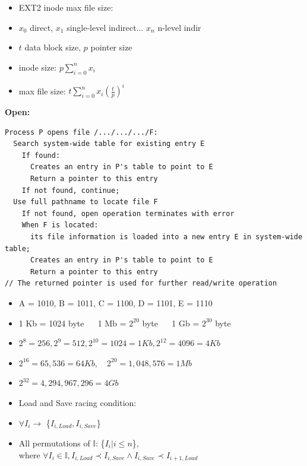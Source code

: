 \documentclass[8pt,twocolumn]{article}
\begin{document}
\begin{itemize}
  \setlength{\itemsep}{0pt} %
  \setlength{\parskip}{0pt}
  \item EXT2 inode max file size: 
    \item $x_0$ direct, $x_1$ single-level indirect... $x_n$ n-level indir
    \item $t$ data block size, $p$ pointer size
    \item inode size: $p\sum_{i=0}^{n}x_i$
    \item max file size: $t\sum_{i=0}^{n}x_i(\frac{t}{p})^i$
\end{itemize}
\vspace{-0.6em}
\textbf{Open:}
\vspace{-0.6em}
\begin{lstlisting}
Process P opens file /.../.../.../F:
  Search system-wide table for existing entry E
    If found:
      Creates an entry in P's table to point to E
      Return a pointer to this entry 
    If not found, continue;
  Use full pathname to locate file F  
    If not found, open operation terminates with error
    When F is located:
      its file information is loaded into a new entry E in system-wide table;
      Creates an entry in P's table to point to E
      Return a pointer to this entry
// The returned pointer is used for further read/write operation
\end{lstlisting}
\begin{itemize}
  \setlength{\itemsep}{0pt} %
  \setlength{\parskip}{0pt}
  \item A = 1010, B = 1011, C = 1100, D = 1101, E = 1110
  \item 1 Kb = 1024 byte $\quad$ 1 Mb = $2^{20}$ byte $\quad$ 1 Gb = $2^{30}$ byte
  \item $2^8 = 256, 2^9 = 512, 2^{10} = 1024 = 1Kb, 2^{12} = 4096 = 4Kb$
  \item $2^{16} = 65,536 = 64Kb,\quad 2^{20} = 1,048,576 = 1Mb$
  \item $2^{32} = 4,294,967,296 = 4Gb$
\end{itemize}
\begin{itemize}
  \setlength{\itemsep}{0pt} %
  \setlength{\parskip}{0pt}
  \item Load and Save racing condition:
  \item $\forall I_i \rightarrow$ \{$I_{i, Load}, I_{i, Save}$\}
  \item All permutations of $\mathbb{I}$: \{$I_i | i \leq n$\}, \\ where $\forall I_i \in \mathbb{I}, I_{i, Load} \prec I_{i, Save} \land I_{i, Save} \prec I_{i+1, Load}$
\end{itemize}
\end{document}
